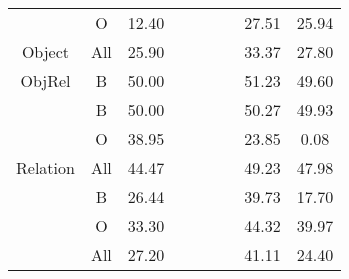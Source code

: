 \begin{tabular}{cccllllcc}
                                                  & O                    & 12.40                                             &                       &                        &                       &                        & 27.51       & 25.94      \\
\multirow{-3}{*}{Object}                          & All                  & 25.90                                             &                       &                        &                       &                        & 33.37       & 27.80      \\
\rowcolor[HTML]{F3F3F3} 
ObjRel                                            & B                    & 50.00                                             &                       &                        &                       &                        & 51.23       & 49.60      \\
                                                  & B                    & 50.00                                             &                       &                        &                       &                        & 50.27       & 49.93      \\
                                                  & O                    & 38.95                                             &                       &                        &                       &                        & 23.85       & 0.08       \\
\multirow{-3}{*}{Relation}                        & All                  & 44.47                                             &                       &                        &                       &                        & 49.23       & 47.98      \\
\rowcolor[HTML]{F3F3F3} 
\cellcolor[HTML]{F3F3F3}                          & B                    & 26.44                                             &                       &                        &                       &                        & 39.73       & 17.70      \\
\rowcolor[HTML]{F3F3F3} 
\cellcolor[HTML]{F3F3F3}                          & O                    & 33.30                                             &                       &                        &                       &                        & 44.32       & 39.97      \\
\rowcolor[HTML]{F3F3F3} 
\multirow{-3}{*}{\cellcolor[HTML]{F3F3F3}Action}  & All                  & 27.20                                             &                       &                        &                       &                        & 41.11       & 24.40      \\

\end{tabular}
